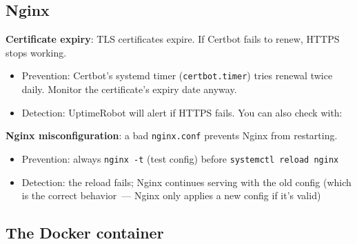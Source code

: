 \subsection*{Nginx}\label{37-reliability:nginx}

\textbf{Certificate expiry}: TLS certificates expire. If Certbot fails to renew, HTTPS stops working.

\begin{itemize}
\tightlist
\item
  Prevention: Certbot's systemd timer (\texttt{certbot.timer}) tries renewal twice daily. Monitor the certificate's expiry date anyway.
\item
  Detection: UptimeRobot will alert if HTTPS fails. You can also check with:
\end{itemize}

\begin{codebox}[short]

\begin{Shaded}
\begin{Highlighting}[]
 \KeywordTok{|} \OperatorTok{\textgreater{}}\KeywordTok{|} \DataTypeTok{\textbackslash{}}
     
\end{Highlighting}
\end{Shaded}

\end{codebox}

\noindent{}\textbf{Nginx misconfiguration}: a bad \texttt{nginx.conf} prevents Nginx from restarting.

\begin{itemize}
\tightlist
\item
  Prevention: always \texttt{nginx\ -t} (test config) before \texttt{systemctl\ reload\ nginx}
\item
  Detection: the reload fails; Nginx continues serving with the old config (which is the correct behavior~--- Nginx only applies a new config if it's valid)
\end{itemize}

\subsection*{The Docker container}\label{37-reliability:the-docker-container}

